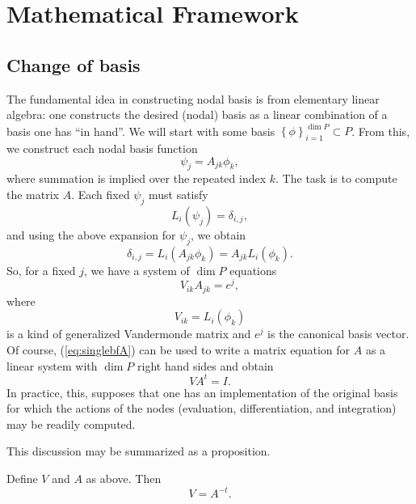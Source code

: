 \section{Mathematical Framework}
\subsection{Change of basis}
The fundamental idea in constructing nodal basis is from elementary
linear algebra: one constructs the desired (nodal) basis as a linear
combination of a basis one has ``in hand''.  We will start with some
basis \( \left\{ \phi \right\}_{i=1}^{\dim P} \subset P \).  From
this, we construct each nodal basis function 
\begin{equation}
 \psi_j = A_{jk} \phi_k,
\end{equation}
where summation is implied over the repeated index \( k \).  The
task is to compute the matrix \( A \).  Each fixed \( \psi_j \) must
satisfy
\begin{equation}
L_i( \psi_j ) = \delta_{i,j},
\end{equation}
and using the above expansion for \( \psi_j \), we obtain
\begin{equation}
\delta_{i,j} = L_i( A_{jk} \phi_{k} ) = A_{jk} L_i (\phi_k).
\end{equation}
So, for a fixed \( j \), we have a system of \( \dim P \) equations
\begin{equation}
\label{eq:singlebfA}
V_{ik} A_{jk} = e^j,
\end{equation}
where
\begin{equation}
V_{ik} = L_i(\phi_k)
\end{equation}
is a kind of generalized Vandermonde matrix and \( e^j \) is the
canonical basis vector.  Of course, (\ref{eq:singlebfA}) can be used
to write a matrix equation for \( A \) as a linear system with \( \dim
P \) right hand sides and obtain
\begin{equation}
V A^t = I.
\end{equation}
In practice, this, supposes that one has an implementation of
the original basis for which the actions of the nodes (evaluation,
differentiation, and integration) may be readily computed.

This discussion may be summarized as a proposition.
\begin{proposition}
Define \( V \) and \( A \) as above.  Then
\begin{equation}
V = A^{-t}.
\end{equation}
\end{proposition}

